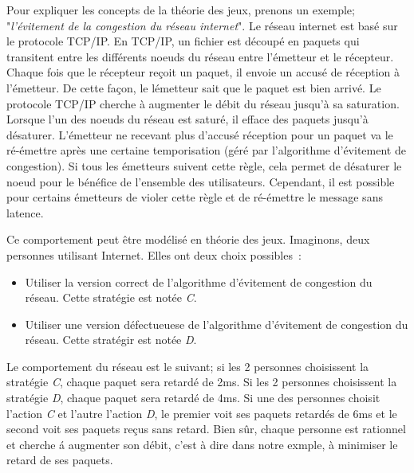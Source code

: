 Pour expliquer les concepts de la th\'eorie des jeux, prenons un exemple; "\emph{l'\'evitement de la congestion du r\'eseau internet}". Le r\'eseau internet est bas\'e sur le protocole TCP/IP. En TCP/IP, un fichier est d\'ecoup\'e en paquets qui transitent entre les diff\'erents noeuds du r\'eseau entre l'\'emetteur et le r\'ecepteur. Chaque fois que le r\'ecepteur re\c{c}oit un paquet, il envoie un accus\'e de r\'eception \`a l'\'emetteur. De cette fa\c{c}on, le l\'emetteur sait que le paquet est bien arriv\'e. Le protocole TCP/IP cherche \`a augmenter le d\'ebit du r\'eseau jusqu'\`a sa saturation. Lorsque l'un des noeuds du r\'eseau est satur\'e, il efface des paquets jusqu'\`a d\'esaturer. L'\'emetteur ne recevant plus d'accus\'e r\'eception pour un paquet va le r\'e-\'emettre apr\`es une certaine temporisation (g\'er\'e par l'algorithme d'\'evitement de congestion). Si tous les \'emetteurs suivent cette r\`egle, cela  permet de d\'esaturer le noeud pour le b\'en\'efice de l'ensemble des utilisateurs. Cependant, il est possible pour certains \'emetteurs de violer cette r\`egle et de r\'e-\'emettre le message sans latence. 

Ce comportement peut \^etre mod\'elis\'e en th\'eorie des jeux.  Imaginons, deux personnes utilisant Internet. Elles ont deux choix possibles\ :
\begin{itemize}
\item Utiliser la version correct de l'algorithme d'\'evitement de congestion du r\'eseau. Cette strat\'egie est not\'ee \emph{C}.
\item Utiliser une version d\'efectueuese de l'algorithme d'\'evitement de congestion du r\'eseau. Cette strat\'egir est not\'ee \emph{D}.
\end{itemize}

Le comportement du r\'eseau est le suivant; si les 2 personnes choisissent la strat\'egie \emph{C}, chaque paquet sera retard\'e de 2ms. Si les 2 personnes choisissent la strat\'egie \emph{D}, chaque paquet sera retard\'e de 4ms. Si une des personnes choisit l'action \emph{C} et l'autre l'action \emph{D}, le premier voit ses paquets retard\'es de 6ms et le second voit ses paquets re\c{c}us sans retard. Bien s\^ur, chaque personne est rationnel et cherche \'a augmenter son d\'ebit, c'est \`a dire dans notre exmple, \`a minimiser le retard de ses paquets.





